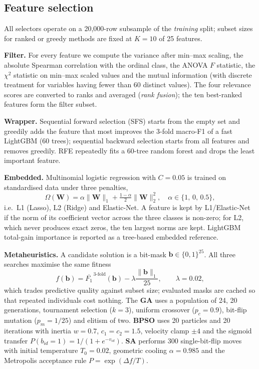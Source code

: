\subsection{Feature selection}
All selectors operate on a 20{,}000-row subsample of the \emph{training} split; subset sizes for ranked or greedy methods are fixed at $K=10$ of 25 features.

\textbf{Filter.} For every feature we compute the variance after min--max scaling, the absolute Spearman correlation with the ordinal class, the ANOVA $F$ statistic, the $\chi^2$ statistic on min--max scaled values and the mutual information (with discrete treatment for variables having fewer than 60 distinct values). The four relevance scores are converted to ranks and averaged (\emph{rank fusion}); the ten best-ranked features form the filter subset.

\textbf{Wrapper.} Sequential forward selection (SFS) starts from the empty set and greedily adds the feature that most improves the 3-fold macro-F1 of a fast LightGBM (60 trees); sequential backward selection starts from all features and removes greedily. RFE repeatedly fits a 60-tree random forest and drops the least important feature.

\textbf{Embedded.} Multinomial logistic regression with $C=0.05$ is trained on standardised data under three penalties,
\begin{equation}
\Omega(\mathbf{W})=\alpha\|\mathbf{W}\|_1+\tfrac{1-\alpha}{2}\|\mathbf{W}\|_2^2,\quad \alpha\in\{1,\,0,\,0.5\},
\end{equation}
i.e.\ L1 (Lasso), L2 (Ridge) and Elastic-Net. A feature is kept by L1/Elastic-Net if the norm of its coefficient vector across the three classes is non-zero; for L2, which never produces exact zeros, the ten largest norms are kept. LightGBM total-gain importance is reported as a tree-based embedded reference.

\textbf{Metaheuristics.} A candidate solution is a bit-mask $\mathbf{b}\in\{0,1\}^{25}$. All three searches maximise the same fitness
\begin{equation}
f(\mathbf{b})=\overline{F_1}^{\,3\text{-fold}}(\mathbf{b})-\lambda\frac{\|\mathbf{b}\|_1}{25},\qquad \lambda=0.02,
\label{eq:fitness}
\end{equation}
which trades predictive quality against subset size; evaluated masks are cached so that repeated individuals cost nothing. The \textbf{GA} uses a population of 24, 20 generations, tournament selection ($k=3$), uniform crossover ($p_c=0.9$), bit-flip mutation ($p_m=1/25$) and elitism of two. \textbf{BPSO} uses 20 particles and 20 iterations with inertia $w=0.7$, $c_1=c_2=1.5$, velocity clamp $\pm4$ and the sigmoid transfer $P(b_{id}=1)=1/(1+e^{-v_{id}})$. \textbf{SA} performs 300 single-bit-flip moves with initial temperature $T_0=0.02$, geometric cooling $\alpha=0.985$ and the Metropolis acceptance rule $P=\exp(\Delta f/T)$.

